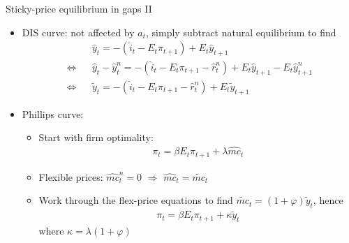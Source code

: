 \documentclass[9pt,xcolor={dvipsnames}]{beamer}
\newcommand{\bit}{\begin{itemize}}
\newcommand{\eit}{\end{itemize}}
\begin{document}
\begin{frame}{Sticky-price equilibrium in gaps II}

\bit
\setlength\itemsep{1.5em}
\item DIS curve: not affected by $a_t$, simply subtract natural equilibrium to find
\begin{eqnarray}
&& \hat y_t = - (\hat i_t-E_t \pi_{t+1}) + E_t \hat y_{t+1} \nonumber \\
\Leftrightarrow && \hat y_t-\hat y^n_t = - (\hat i_t-E_t \pi_{t+1}-\hat r^n_t) + E_t \hat y_{t+1}-E_t \hat y^n_{t+1}  \nonumber \\
\Leftrightarrow && \tilde y_t = - (\hat i_t-E_t \pi_{t+1}-\hat r^n_t) + E_t \tilde y_{t+1}  \nonumber
\end{eqnarray}


\item Phillips curve: 
\bit
\setlength\itemsep{0.5em}
	\item Start with firm optimality:
	\begin{eqnarray}
	\pi_t = \beta E_t \pi_{t+1} + \lambda \widehat{mc}_t \nonumber
	\end{eqnarray}

	\item Flexible prices: $\widehat{mc}^n_t = 0$ $\Rightarrow$ $\widehat{mc}_t = \widetilde{mc}_t $
	
	\item Work through the flex-price equations to find $\widetilde{mc}_t = (1+\varphi) \tilde y_t$, hence
	\begin{eqnarray}
	\pi_t = \beta E_t \pi_{t+1} + \kappa \tilde y_t \nonumber 
	\end{eqnarray}
	where $\kappa = \lambda (1+\varphi)$
\eit

\eit

\end{frame}
\end{document}
